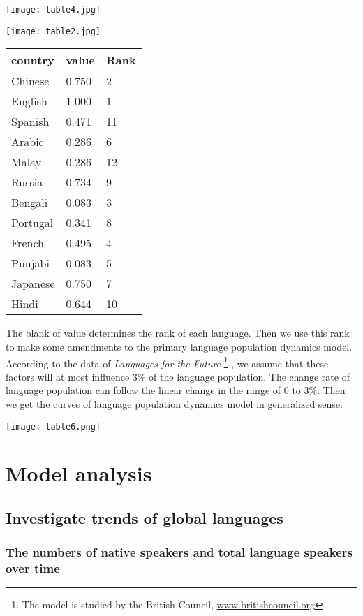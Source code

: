 \documentclass{mcmthesis}
\begin{document}
\texttt{[image: table4.jpg]}

\texttt{[image: table2.jpg]}

\begin{tabular}{|l|l|l|}\hline
   country   & value &  Rank\\ \hline
  Chinese & 0.750&2 \\ \hline
  English & 1.000 &1\\ \hline
  Spanish & 0.471 &11\\ \hline
  Arabic & 0.286 &6\\ \hline
  Malay & 0.286 &12\\ \hline
  Russia & 0.734 &9 \\ \hline
  Bengali & 0.083 &3 \\ \hline
  Portugal & 0.341 &8 \\ \hline
  French & 0.495 &4 \\ \hline
  Punjabi & 0.083 &5  \\ \hline
  Japanese & 0.750 &7 \\ \hline
  Hindi & 0.644 & 10 \\ \hline
\end{tabular}



The blank of value determines the rank of each language. Then we use this rank to make some amendments to the primary language population dynamics model. According to the data of \emph{Languages for the Future} \footnote{The model is studied by the British Council, \url{www.britishcouncil.org}} , we assume that these factors will at most influence 3\% of the language population. The change rate of language population can follow the linear change in the range of 0 to 3\%. Then we get the curves of  language population dynamics model in generalized sense.

\texttt{[image: table6.png]}




\section{Model analysis}
\subsection{Investigate trends of global languages}
\subsubsection{The numbers of native speakers and total language speakers over time}
\end{document}
